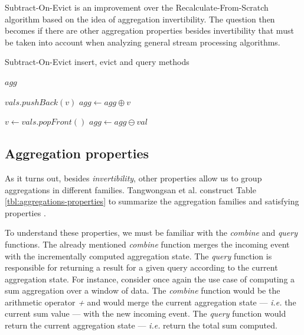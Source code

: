 Subtract-On-Evict is an improvement over the Recalculate-From-Scratch algorithm based on the idea of aggregation invertibility. The question then becomes if there are other aggregation properties besides invertibility that must be taken into account when analyzing general stream processing algorithms.

\begin{algorithm}
    \caption{Subtract-On-Evict insert, evict and query methods}
    \label{pseudo:soe}
    \begin{algorithmic}[1]
        
            \State \Return $agg$
        \EndFunction
        
        
        
            \State $vals.pushBack(v)$
            \State $agg \gets agg \oplus v$
        \EndFunction
        
        
        
            \State $v \gets vals.popFront()$
            \State $agg \gets agg \ominus val$
        \EndFunction
    \end{algorithmic}
\end{algorithm}

\subsection{Aggregation properties}
\label{sec:agg-properties}

As it turns out, besides \textit{invertibility}, other properties allow us to group aggregations in different families. Tangwongsan et al. construct Table \ref{tbl:aggregations-properties} to summarize the aggregation families and satisfying properties \cite{Tangwongsan-Sliding-Window-Aggregation-Algorithms}.

To understand these properties, we must be familiar with the \textit{combine} and \textit{query} functions. The already mentioned \textit{combine} function merges the incoming event with the incrementally computed aggregation state. The \textit{query} function is responsible for returning a result for a given query according to the current aggregation state. For instance, consider once again the use case of computing a sum aggregation over a window of data. The \textit{combine} function would be the arithmetic operator \textit{+} and would merge the current aggregation state --- \textit{i.e.} the current sum value --- with the new incoming event. The \textit{query} function would return the current aggregation state --- \textit{i.e.} return the total sum computed.



